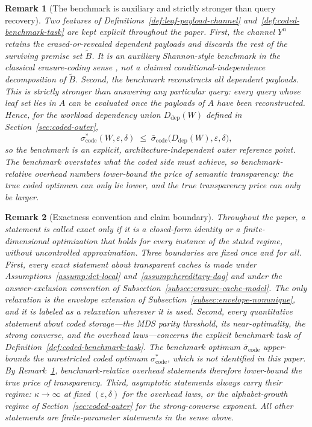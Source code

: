\documentclass[journal]{IEEEtran}
\newtheorem{remark}{Remark}[section]
\numberwithin{equation}{section}
\begin{document}
\begin{remark}[The benchmark is auxiliary and strictly stronger than query recovery]
\label{rem:benchmark-honesty}
Two features of Definitions~\ref{def:leaf-payload-channel}
and~\ref{def:coded-benchmark-task} are kept explicit throughout the paper.
First, the channel \(Y^{n}\) retains the erased-or-revealed dependent
payloads and discards the rest of the surviving premise set \(\widetilde B\).
It is an auxiliary Shannon-style benchmark in the classical erasure-coding
sense \cite{cover2006elements,polyanskiy2010channel}, not a claimed
conditional-independence decomposition of \(\widetilde B\).
Second, the benchmark reconstructs \emph{all} dependent payloads.  This is
strictly stronger than answering any particular query: every query whose leaf
set lies in \(A\) can be evaluated once the payloads of \(A\) have been
reconstructed.  Hence, for the workload dependency union
\(D_{\mathrm{dep}}(W)\) defined in Section~\ref{sec:coded-outer},
\[
  \sigma_{\mathrm{code}}^{*}(W,\varepsilon,\delta)
  \;\le\;
  \bar\sigma_{\mathrm{code}}
  \bigl(D_{\mathrm{dep}}(W),\varepsilon,\delta\bigr),
\]
so the benchmark is an explicit, architecture-independent \emph{outer}
reference point.  The benchmark overstates what the coded side must achieve,
so benchmark-relative overhead numbers \emph{lower-bound} the price of
semantic transparency: the true coded optimum can only lie lower, and the
true transparency price can only be larger.
\end{remark}

\begin{remark}[Exactness convention and claim boundary]
\label{rem:exactness-convention}
Throughout the paper, a statement is called \emph{exact} only if it is a
closed-form identity or a finite-dimensional optimization that holds for
every instance of the stated regime, without uncontrolled approximation.
Three boundaries are fixed once and for all.  First, every exact statement
about transparent caches is made under Assumptions~\ref{assump:det-local}
and~\ref{assump:hereditary-dag} and under the answer-exclusion convention of
Subsection~\ref{subsec:erasure-cache-model}.  The only relaxation is the
envelope extension of Subsection~\ref{subsec:envelope-nonunique}, and it is
labeled as a relaxation wherever it is used.  Second, every quantitative
statement about coded storage---the MDS parity threshold, its
near-optimality, the strong converse, and the overhead laws---concerns the
explicit benchmark task of Definition~\ref{def:coded-benchmark-task}.  The
benchmark optimum \(\bar\sigma_{\mathrm{code}}\) upper-bounds the
unrestricted coded optimum \(\sigma_{\mathrm{code}}^{*}\), which is not
identified in this paper.  By Remark~\ref{rem:benchmark-honesty},
benchmark-relative overhead statements therefore lower-bound the true price
of transparency.  Third, asymptotic statements always carry their regime:
\(\kappa\to\infty\) at fixed \((\varepsilon,\delta)\) for the overhead laws,
or the alphabet-growth regime of Section~\ref{sec:coded-outer} for the
strong-converse exponent.  All other statements are finite-parameter
statements in the sense above.
\end{remark}
\end{document}
